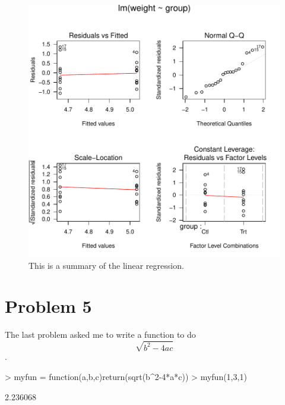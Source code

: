 \documentclass{article}
\begin{document}
\begin{figure}[h]
\begin{center}
\includegraphics{sweave_example-summary_plot}
\end{center}
\caption{This is a summary of the linear regression.}
\label{fig:summarylm}
\end{figure}

\section*{Problem 5}
The last problem asked me to write a function to do $$\sqrt{b^2 - 4ac}$$.

\begin{Schunk}
\begin{Sinput}
> myfun = function(a,b,c){return(sqrt(b^2-4*a*c))}
> myfun(1,3,1)
\end{Sinput}
\begin{Soutput}
[1] 2.236068
\end{Soutput}
\end{Schunk}
\end{document}
